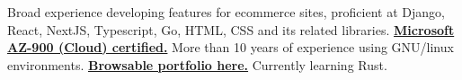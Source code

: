 


\begin{cvpubs}

  \cvpub
    {
      \begin{cvlist}
  \item { Broad experience developing features for ecommerce sites, proficient at Django, React, NextJS, Typescript, Go, HTML, CSS and its related libraries. \textbf{\href{https://www.credly.com/badges/17608a52-2cb7-4268-a907-613459559911/public_url}{Microsoft AZ-900 (Cloud) certified.}} More than 10 years of experience using GNU/linux environments. \textbf{\href{https://eduardozepeda.dev/\#portfolio}{Browsable portfolio here.}}} Currently learning Rust. 
      \end{cvlist}
    }\vspace{-1pt}
\end{cvpubs}
